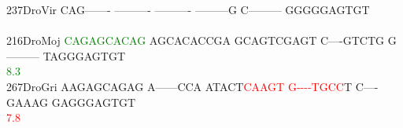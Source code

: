 \documentclass[11pt,twoside,reqno,a4paper]{article}
\begin{document}
{237\hspace*{1\charwidth}DroVir	CAG-------	----------	----------	---------G	C---------	GGGGGAGTGT	\\
\hspace*{4\charwidth}\hspace*{7\charwidth}\hspace*{1\charwidth}\hspace*{1\charwidth}\hspace*{1\charwidth}\hspace*{1\charwidth}\hspace*{1\charwidth}\hspace*{1\charwidth}\\
216\hspace*{1\charwidth}DroMoj	\textcolor{Green}{C}\textcolor{Green}{A}\textcolor{Green}{G}\textcolor{Green}{A}\textcolor{Green}{G}\textcolor{Green}{C}\textcolor{Green}{A}\textcolor{Green}{C}\textcolor{Green}{A}\textcolor{Green}{G}	AGCACACCGA	GCAGTCGAGT	C----GTCTG	G---------	TAGGGAGTGT	\\
\hspace*{4\charwidth}\hspace*{7\charwidth}\hspace*{0\charwidth}\textcolor{Green}{8.3}\hspace*{1\charwidth}\hspace*{1\charwidth}\hspace*{1\charwidth}\hspace*{1\charwidth}\hspace*{1\charwidth}\hspace*{1\charwidth}\\
267\hspace*{1\charwidth}DroGri	AAGAGCAGAG	A------CCA	ATACT\textcolor{Red}{C}\textcolor{Red}{A}\textcolor{Red}{A}\textcolor{Red}{G}\textcolor{Red}{T}	\textcolor{Red}{G}\textcolor{Red}{-}\textcolor{Red}{-}\textcolor{Red}{-}\textcolor{Red}{-}\textcolor{Red}{T}\textcolor{Red}{G}\textcolor{Red}{C}\textcolor{Red}{C}T	C----GAAAG	GAGGGAGTGT	\\
\hspace*{4\charwidth}\hspace*{7\charwidth}\hspace*{1\charwidth}\hspace*{1\charwidth}\hspace*{25\charwidth}\textcolor{Red}{7.8}\hspace*{1\charwidth}\hspace*{1\charwidth}\hspace*{1\charwidth}\hspace*{1\charwidth}\\
}
\end{document}
